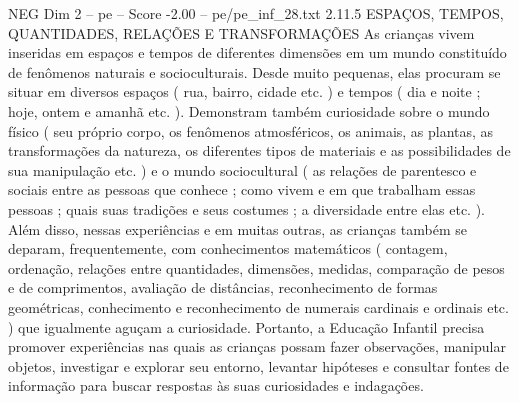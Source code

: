\begin{textsample}{NEG Dim 2 – pe – Score -2.00 – pe/pe\_inf\_28.txt}  \label{ex:f2_neg_031}
2.11.5 ESPAÇOS, TEMPOS, QUANTIDADES, RELAÇÕES E TRANSFORMAÇÕES As crianças vivem inseridas em espaços e tempos de diferentes dimensões em um mundo constituído de fenômenos naturais e socioculturais.
Desde muito pequenas, elas procuram se situar em diversos espaços ( rua, bairro, cidade etc. ) e tempos ( dia e noite ; hoje, ontem e amanhã etc. ).
Demonstram também curiosidade sobre o mundo físico ( seu próprio corpo, os fenômenos atmosféricos, os animais, as plantas, as transformações da natureza, os diferentes tipos de materiais e as possibilidades de sua manipulação etc. ) e o mundo sociocultural ( as relações de parentesco e sociais entre as pessoas que conhece ; como vivem e em que trabalham essas pessoas ; quais suas tradições e seus costumes ; a diversidade entre elas etc. ).
Além disso, nessas experiências e em muitas outras, as crianças também se deparam, frequentemente, com conhecimentos matemáticos ( contagem, ordenação, relações entre quantidades, dimensões, medidas, comparação de pesos e de comprimentos, avaliação de distâncias, reconhecimento de formas geométricas, conhecimento e reconhecimento de numerais cardinais e ordinais etc. ) que igualmente aguçam a curiosidade.
Portanto, a Educação Infantil precisa promover experiências nas quais as crianças possam fazer observações, manipular objetos, investigar e explorar seu entorno, levantar hipóteses e consultar fontes de informação para buscar respostas às suas curiosidades e indagações.

\end{textsample}
